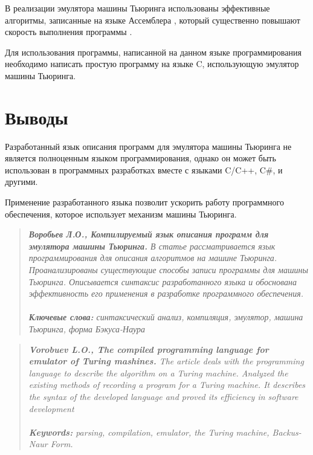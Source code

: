 \documentclass[10pt, normalheadings]{scrartcl}
\begin{document}
В реализации эмулятора машины Тьюринга использованы эффективные алгоритмы, записанные на языке Ассемблера \cite{Magda_ASM_Pentium}, который существенно повышают скорость выполнения программы \cite{Magda_ASM_Windows}.

Для использования программы, написанной на данном языке программирования необходимо написать простую программу на языке C, использующую эмулятор машины Тьюринга.

\section*{Выводы}

Разработанный язык описания программ для эмулятора машины Тьюринга не является полноценным языком программирования, однако он может быть использован в программных разработках вместе с языками C/C++, C\#, и другими.

Применение разработанного языка позволит ускорить работу программного обеспечения, которое использует механизм машины Тьюринга.


 


\begin{abstract}\itshape \noindent
	\textbf{Воробьев Л.О., Компилируемый язык описания программ для эмулятора машины Тьюринга.}
	В статье рассматривается язык программирования для описания алгоритмов на машине Тьюринга. Проанализированы существующие способы записи программы для машины Тьюринга.
	Описывается синтаксис разработанного языка и обоснована эффективность его применения в разработке программного обеспечения.
	\\ \\
	\textbf{Ключевые слова:} синтаксический анализ, компиляция, эмулятор, машина Тьюринга, форма Бэкуса-Наура
\end{abstract}

\begin{abstract}\itshape \noindent
	\textbf{Vorobuev L.O., The compiled programming language for emulator of Turing mashines.}
	The article deals with the programming language to describe the algorithm on a Turing machine. Analyzed the existing methods of recording a program for a Turing machine.
	It describes the syntax of the developed language and proved its efficiency in software development
	\\ \\
	\textbf{Keywords:} parsing, compilation, emulator, the Turing machine, Backus-Naur Form.
\end{abstract}
\end{document}
